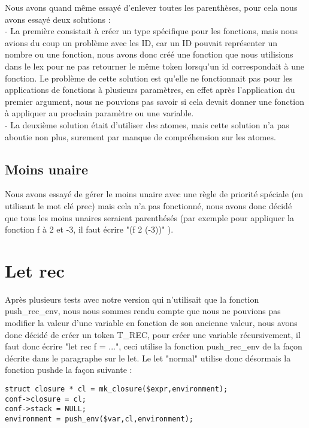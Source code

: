 \documentclass{report}
\begin{document}
Nous avons quand même essayé d'enlever toutes les parenthèses, pour cela nous avons essayé deux solutions :\\
- La première consistait à créer un type spécifique pour les fonctions, mais nous avions du coup un problème avec les ID, car un ID pouvait représenter un nombre ou une fonction, nous avons donc créé une fonction que nous utilisions dans le lex pour ne pas retourner le même token lorsqu'un id correspondait à une fonction. Le problème de cette solution est qu'elle ne fonctionnait pas pour les applications de fonctions à plusieurs paramètres, en effet après l'application du premier argument, nous ne pouvions pas savoir si cela devait donner une fonction à appliquer au prochain paramètre ou une variable.\\
- La deuxième solution était d'utiliser des atomes, mais cette solution n'a pas aboutie non plus, surement par manque de compréhension sur les atomes.

\subsection{Moins unaire}
Nous avons essayé de gérer le moins unaire avec une règle de priorité spéciale (en utilisant le mot clé prec) mais cela n'a pas fonctionné, nous avons donc décidé que tous les moins unaires seraient parenthésés (par exemple pour appliquer la fonction f à 2 et -3, il faut écrire "(f 2 (-3))" ).

\section{Let rec}
Après plusieurs tests avec notre version qui n'utilisait que la fonction push\_rec\_env, nous nous sommes rendu compte que nous ne pouvions pas modifier la valeur d'une variable en fonction de son ancienne valeur, nous avons donc décidé de créer un token T\_REC, pour créer une variable récursivement, il faut donc écrire "let rec f = ...", ceci utilise la fonction push\_rec\_env de la façon décrite dans le paragraphe sur le let. Le let "normal" utilise donc désormais la fonction push\env de la façon suivante :
\begin{verbatim}
struct closure * cl = mk_closure($expr,environment);
conf->closure = cl;
conf->stack = NULL;
environment = push_env($var,cl,environment);
\end{verbatim}
\end{document}

